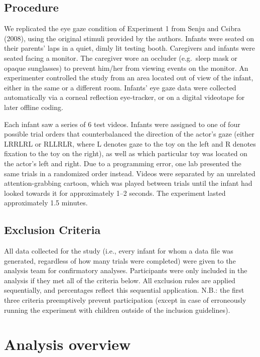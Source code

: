 \documentclass[,man,floatsintext]{apa6}
\begin{document}
\hypertarget{procedure}{%
\subsection{Procedure}\label{procedure}}

We replicated the eye gaze condition of Experiment 1 from Senju and Csibra (2008), using the original stimuli provided by the authors. Infants were seated on their parents' laps in a quiet, dimly lit testing booth. Caregivers and infants were seated facing a monitor. The caregiver wore an occluder (e.g.~sleep mask or opaque sunglasses) to prevent him/her from viewing events on the monitor. An experimenter controlled the study from an area located out of view of the infant, either in the same or a different room. Infants' eye gaze data were collected automatically via a corneal reflection eye-tracker, or on a digital videotape for later offline coding.

Each infant saw a series of 6 test videos. Infants were assigned to one of four possible trial orders that counterbalanced the direction of the actor's gaze (either LRRLRL or RLLRLR, where L denotes gaze to the toy on the left and R denotes fixation to the toy on the right), as well as which particular toy was located on the actor's left and right. Due to a programming error, one lab presented the same trials in a randomized order instead. Videos were separated by an unrelated attention-grabbing cartoon, which was played between trials until the infant had looked towards it for approximately 1--2 seconds. The experiment lasted approximately 1.5 minutes.

\hypertarget{exclusion-criteria}{%
\subsection{Exclusion Criteria}\label{exclusion-criteria}}

All data collected for the study (i.e., every infant for whom a data file was generated, regardless of how many trials were completed) were given to the analysis team for confirmatory analyses. Participants were only included in the analysis if they met all of the criteria below. All exclusion rules are applied sequentially, and percentages reflect this sequential application. N.B.: the first three criteria preemptively prevent participation (except in case of erroneously running the experiment with children outside of the inclusion guidelines).

\hypertarget{analysis-overview}{%
\section{Analysis overview}\label{analysis-overview}}
\end{document}
